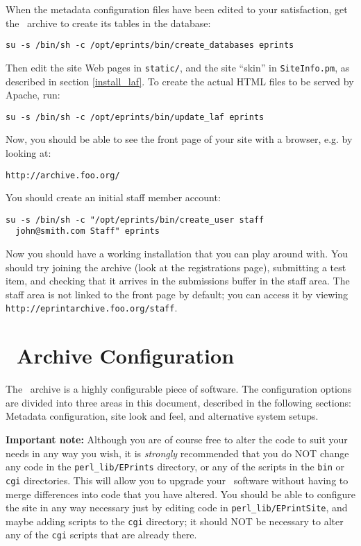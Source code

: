 When the metadata configuration files have been edited to your satisfaction, get the \eprints\ archive to create its tables in the database:

\begin{verbatim}
su -s /bin/sh -c /opt/eprints/bin/create_databases eprints
\end{verbatim}

Then edit the site Web pages in {\tt static/}, and the site ``skin'' in {\tt SiteInfo.pm}, as described in section \ref{install_laf}. To create the actual HTML files to be served by Apache, run:

\begin{verbatim}
su -s /bin/sh -c /opt/eprints/bin/update_laf eprints
\end{verbatim}

Now, you should be able to see the front page of your site with a browser, e.g. by looking at:

\begin{verbatim}
http://archive.foo.org/
\end{verbatim}

You should create an initial staff member account:

\begin{verbatim}
su -s /bin/sh -c "/opt/eprints/bin/create_user staff
  john@smith.com Staff" eprints
\end{verbatim}


Now you should have a working installation that you can play around with. You should try joining the archive (look at the registrations page), submitting a test item, and checking that it arrives in the submissions buffer in the staff area. The staff area is not linked to the front page by default; you can access it by viewing {\tt http://eprintarchive.foo.org/staff}.


\section{\eprints\ Archive Configuration}
\label{install_configure}

The \eprints\ archive is a highly configurable piece of software. The configuration options are divided into three areas in this document, described in the following sections: Metadata configuration, site look and feel, and alternative system setups.

{\bf Important note:} Although you are of course free to alter the code to suit your needs in any way you wish, it is \emph{strongly} recommended that you do NOT change any code in the {\tt perl\_lib/EPrints} directory, or any of the scripts in the {\tt bin} or {\tt cgi} directories. This will allow you to upgrade your \eprints\ software without having to merge differences into code that you have altered. You should be able to configure the site in any way necessary just by editing code in {\tt perl\_lib/EPrintSite}, and maybe adding scripts to the {\tt cgi} directory; it should NOT be necessary to alter any of the {\tt cgi} scripts that are already there.


